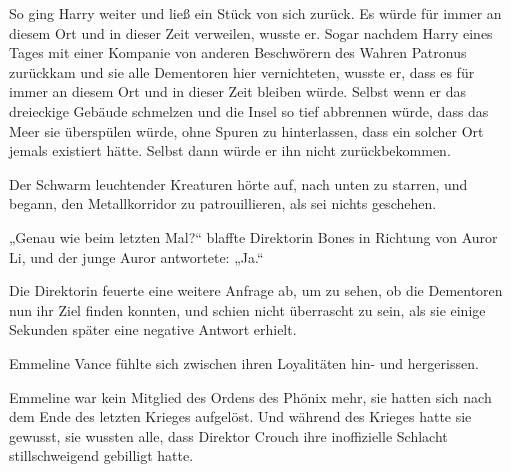 So ging Harry weiter und ließ ein Stück von sich zurück. Es würde für immer an diesem Ort und in dieser Zeit verweilen, wusste er. Sogar nachdem Harry eines Tages mit einer Kompanie von anderen Beschwörern des Wahren Patronus zurückkam und sie alle Dementoren hier vernichteten, wusste er, dass es für immer an diesem Ort und in dieser Zeit bleiben würde. Selbst wenn er das dreieckige Gebäude schmelzen und die Insel so tief abbrennen würde, dass das Meer sie überspülen würde, ohne Spuren zu hinterlassen, dass ein solcher Ort jemals existiert hätte. Selbst dann würde er ihn nicht zurückbekommen.

\later

Der Schwarm leuchtender Kreaturen hörte auf, nach unten zu starren, und begann, den Metallkorridor zu patrouillieren, als sei nichts geschehen.

„Genau wie beim letzten Mal?“ blaffte Direktorin Bones in Richtung von Auror Li, und der junge Auror antwortete:
„Ja.“

Die Direktorin feuerte eine weitere Anfrage ab, um zu sehen, ob die Dementoren nun ihr Ziel finden konnten, und schien nicht überrascht zu sein, als sie einige Sekunden später eine negative Antwort erhielt.

Emmeline Vance fühlte sich zwischen ihren Loyalitäten hin- und hergerissen.

Emmeline war kein Mitglied des Ordens des Phönix mehr, sie hatten sich nach dem Ende des letzten Krieges aufgelöst. Und während des Krieges hatte sie gewusst, sie wussten alle, dass Direktor Crouch ihre inoffizielle Schlacht stillschweigend gebilligt hatte.

